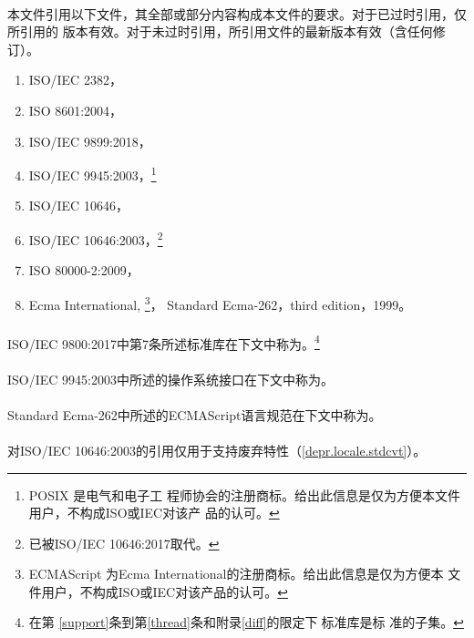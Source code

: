 \paragraph{} %
本文件引用以下文件，其全部或部分内容构成本文件的要求。对于已过时引用，仅所引用的
版本有效。对于未过时引用，所引用文件的最新版本有效（含任何修订）。
\begin{enumerate}
  \item ISO/IEC 2382，
  \item ISO 8601:2004，
  \item ISO/IEC 9899:2018，
  \item ISO/IEC 9945:2003，\footnote{POSIX \textregistered{}是电气和电子工
        程师协会的注册商标。给出此信息是仅为方便本文件用户，不构成ISO或IEC对该产
        品的认可。}
  \item ISO/IEC 10646，
  \item ISO/IEC 10646:2003，\footnote{已被ISO/IEC 10646:2017取代。}
  \item ISO 80000-2:2009，
  \item Ecma International,  \footnote{ECMAScript
        \textregistered{}为Ecma International的注册商标。给出此信息是仅为方便本
        文件用户，不构成ISO或IEC对该产品的认可。}，
        Standard Ecma-262，third edition，1999。
\end{enumerate}

\paragraph{} %
ISO/IEC 9800:2017中第7条所述标准库在下文中称为。\footnote{在第
\ref{support}条到第\ref{thread}条和附录\ref{diff}的限定下，\c{}标准库是\cpp{}标
准的子集。}

\paragraph{} %
ISO/IEC 9945:2003中所述的操作系统接口在下文中称为。

\paragraph{} %
Standard Ecma-262中所述的ECMAScript语言规范在下文中称为。

\paragraph{} %
\begin{note}
对ISO/IEC 10646:2003的引用仅用于支持废弃特性（\ref{depr.locale.stdcvt}）。
\end{note}
